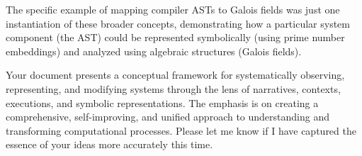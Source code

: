 \documentclass{article}
\begin{document}
The specific example of mapping compiler ASTs to Galois fields was just one instantiation of these broader concepts, demonstrating how a particular system component (the AST) could be represented symbolically (using prime number embeddings) and analyzed using algebraic structures (Galois fields).

Your document presents a conceptual framework for systematically observing, representing, and modifying systems through the lens of narratives, contexts, executions, and symbolic representations. The emphasis is on creating a comprehensive, self-improving, and unified approach to understanding and transforming computational processes. Please let me know if I have captured the essence of your ideas more accurately this time.


 
\end{document}
